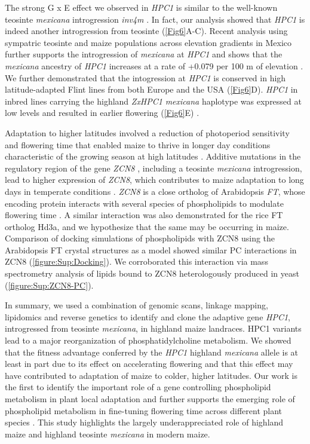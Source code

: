 \documentclass[9pt,twocolumn,twoside,lineno]{biorxiv}
\newcommand{\mex}{\textit{mexicana}\xspace}
\newcommand{\hpc}{\textit{HPC1}\xspace}
\begin{document}
The strong G x E effect we observed in \hpc is similar to the well-known teosinte \mex introgression \textit{inv4m} \cite{Crow2020-gene}. 
In fact, our analysis showed that \hpc is indeed another introgression from teosinte  (\cref{Fig6}A-C). 
Recent analysis using sympatric teosinte and maize populations across elevation gradients in Mexico further supports the introgression of \mex at \hpc and shows that the \mex ancestry of \hpc increases at a rate of +0.079 per 100 m of elevation \cite{Calfee2021-mr}.
We further demonstrated that the  intogression at \hpc is conserved in high latitude-adapted Flint lines from both Europe and the USA (\cref{Fig6}D).
\textit{HPC1} in inbred lines carrying the highland \textit{ZxHPC1} \mex haplotype was expressed at low levels and resulted in earlier flowering (\cref{Fig6}E) \cite{Kremling2018-gn}.  

Adaptation to higher latitudes involved a reduction of photoperiod sensitivity and flowering time that enabled maize to thrive in longer day conditions characteristic of the growing season at high latitudes \cite{Hung2012-ms, Swarts2017-ge, Yang2013-lg, Huang2018-ga}.
Additive mutations in the regulatory region of the gene \textit{ZCN8} \cite{Lazakis2011-nq}, including a teosinte \mex introgression, lead to higher expression of \textit{ZCN8}, which contributes to maize adaptation to long days in temperate conditions \cite{Guo2019-pn}.
\textit{ZCN8} is a close ortholog of Arabidopsis \textit{FT}, whose encoding protein interacts with several species of phospholipids to modulate flowering time \cite{Nakamura2014-qf, Susila2021-dz}. 
A similar interaction was also demonstrated for the rice FT ortholog Hd3a, \cite{Qu2021-wc} and we hypothesize that the same may be occurring in maize. 
Comparison of docking simulations of phospholipids with ZCN8 using the Arabidopsis FT crystal structures as a model \cite{Nakamura2019-ht} showed similar PC interactions in ZCN8 (\cref{figure:Sup:Docking}).
We corroborated this interaction via mass spectrometry analysis of lipids bound to ZCN8 heterologously produced in yeast (\cref{figure:Sup:ZCN8-PC}). 

In summary, we used a combination of genomic scans, linkage mapping, lipidomics and reverse genetics to identify and clone the adaptive gene \hpc, introgressed from teosinte  \mex, in highland maize landraces. 
HPC1 variants lead to a major reorganization of phosphatidylcholine metabolism. 
We showed that the fitness advantage conferred by the \hpc highland \mex allele is at least in part due to its effect on accelerating flowering and that this effect may have contributed to adaptation of maize to colder, higher latitudes. 
Our work is the first to identify the important role of a gene controlling phospholipid metabolism in plant local adaptation and further supports the emerging role of phospholipid metabolism in fine-tuning flowering time across different plant species \cite{Nakamura2014-qf, Susila2021-dz, Guo2019-pn}.
This study highlights the largely underappreciated role of highland maize and highland teosinte \mex in modern maize.
\end{document}

